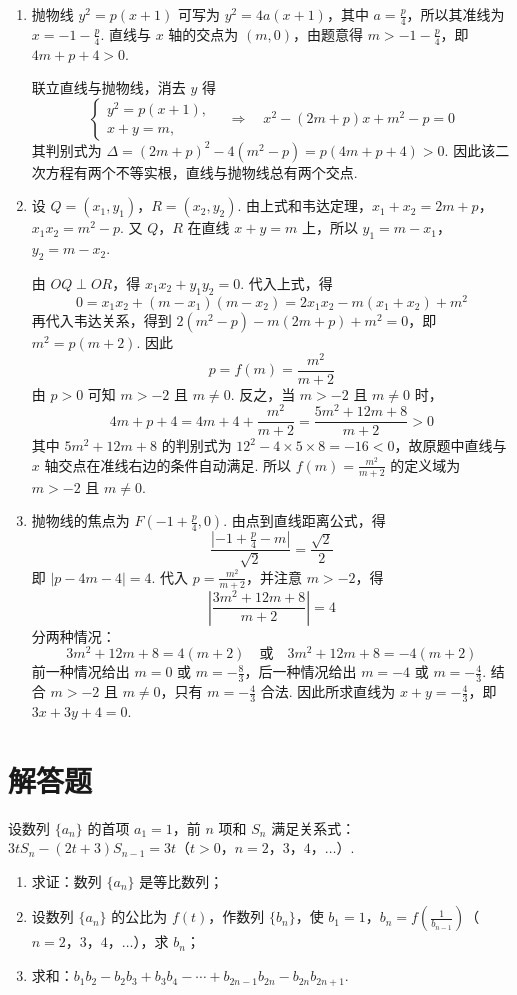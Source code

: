 \begin{solution}
\begin{enumerate}
\item 抛物线 \(y^2=p(x+1)\) 可写为 \(y^2=4a(x+1)\)，其中 \(a=\frac p4\)，所以其准线为 \(x=-1-\frac p4\). 直线与 \(x\) 轴的交点为 \((m,0)\)，由题意得 \(m>-1-\frac p4\)，即 \(4m+p+4>0\).

联立直线与抛物线，消去 \(y\) 得
\[
\begin{cases}
y^2=p(x+1),\\
x+y=m,
\end{cases}
\quad\Longrightarrow\quad x^2-(2m+p)x+m^2-p=0
\]
其判别式为 \(\Delta=(2m+p)^2-4(m^2-p)=p(4m+p+4)>0\). 因此该二次方程有两个不等实根，直线与抛物线总有两个交点.
\item 设 \(Q=(x_1,y_1)\)，\(R=(x_2,y_2)\). 由上式和韦达定理，\(x_1+x_2=2m+p\)，\(x_1x_2=m^2-p\). 又 \(Q\)，\(R\) 在直线 \(x+y=m\) 上，所以 \(y_1=m-x_1\)，\(y_2=m-x_2\).

由 \(OQ\perp OR\)，得 \(x_1x_2+y_1y_2=0\). 代入上式，得
\[
0=x_1x_2+(m-x_1)(m-x_2)=2x_1x_2-m(x_1+x_2)+m^2
\]
再代入韦达关系，得到 \(2(m^2-p)-m(2m+p)+m^2=0\)，即 \(m^2=p(m+2)\). 因此
\[
p=f(m)=\frac{m^2}{m+2}
\]
由 \(p>0\) 可知 \(m>-2\) 且 \(m\neq0\). 反之，当 \(m>-2\) 且 \(m\neq0\) 时，
\[
4m+p+4=4m+4+\frac{m^2}{m+2}=\frac{5m^2+12m+8}{m+2}>0
\]
其中 \(5m^2+12m+8\) 的判别式为 \(12^2-4\times5\times8=-16<0\)，故原题中直线与 \(x\) 轴交点在准线右边的条件自动满足. 所以 \(f(m)=\frac{m^2}{m+2}\) 的定义域为 \(m>-2\) 且 \(m\neq0\).
\item 抛物线的焦点为 \(F\left(-1+\frac p4,0\right)\). 由点到直线距离公式，得
\[
\frac{\left|-1+\frac p4-m\right|}{\sqrt2}=\frac{\sqrt2}{2}
\]
即 \(|p-4m-4|=4\). 代入 \(p=\frac{m^2}{m+2}\)，并注意 \(m>-2\)，得
\[
\left|\frac{3m^2+12m+8}{m+2}\right|=4
\]
分两种情况：
\[
3m^2+12m+8=4(m+2)\quad\text{或}\quad3m^2+12m+8=-4(m+2)
\]
前一种情况给出 \(m=0\) 或 \(m=-\frac83\)，后一种情况给出 \(m=-4\) 或 \(m=-\frac43\). 结合 \(m>-2\) 且 \(m\neq0\)，只有 \(m=-\frac43\) 合法. 因此所求直线为 \(x+y=-\frac43\)，即 \(3x+3y+4=0\).
\end{enumerate}
\end{solution}

\section{解答题}

\begin{problem}
设数列 \(\{a_{n}\}\) 的首项 \(a_{1}=1\)，前 \(n\) 项和 \(S_{n}\) 满足关系式：\(3tS_{n}-(2t+3)S_{n-1}=3t\)（\(t>0\)，\(n=2\)，\(3\)，\(4\)，\(\dots\)）.

\begin{enumerate}
\item 求证：数列 \(\{a_{n}\}\) 是等比数列；
\item 设数列 \(\{a_{n}\}\) 的公比为 \(f(t)\)，作数列 \(\{b_{n}\}\)，使 \(b_{1}=1\)，\(b_{n}=f\left(\frac{1}{b_{n-1}}\right)\)（\(n=2\)，\(3\)，\(4\)，\(\dots\)），求 \(b_{n}\)；
\item 求和：\(b_{1}b_{2}-b_{2}b_{3}+b_{3}b_{4}-\cdots+b_{2n-1}b_{2n}-b_{2n}b_{2n+1}\).
\end{enumerate}
\end{problem}

